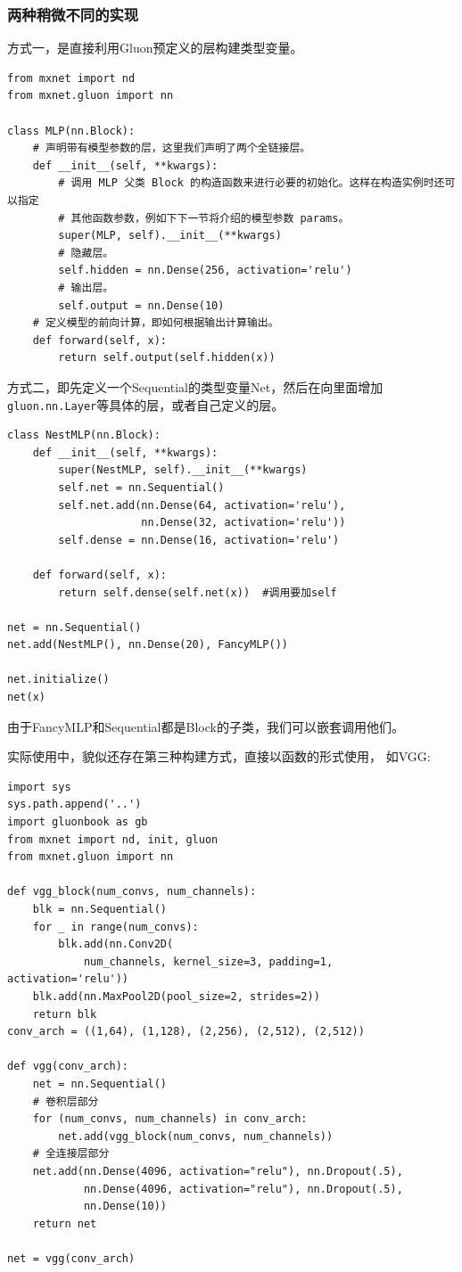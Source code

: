 \subsubsection{两种稍微不同的实现}
方式一，是直接利用Gluon预定义的层构建类型变量。
\begin{lstlisting}
from mxnet import nd
from mxnet.gluon import nn

class MLP(nn.Block):
    # 声明带有模型参数的层，这里我们声明了两个全链接层。
    def __init__(self, **kwargs):
        # 调用 MLP 父类 Block 的构造函数来进行必要的初始化。这样在构造实例时还可以指定
        # 其他函数参数，例如下下一节将介绍的模型参数 params。
        super(MLP, self).__init__(**kwargs)
        # 隐藏层。
        self.hidden = nn.Dense(256, activation='relu')
        # 输出层。
        self.output = nn.Dense(10)
    # 定义模型的前向计算，即如何根据输出计算输出。
    def forward(self, x):
        return self.output(self.hidden(x))
\end{lstlisting}

方式二，即先定义一个Sequential的类型变量Net，然后在向里面增加\verb|gluon.nn.Layer|等具体的层，或者自己定义的层。
\begin{lstlisting}
class NestMLP(nn.Block):
    def __init__(self, **kwargs):
        super(NestMLP, self).__init__(**kwargs)
        self.net = nn.Sequential()
        self.net.add(nn.Dense(64, activation='relu'),
                     nn.Dense(32, activation='relu'))
        self.dense = nn.Dense(16, activation='relu')

    def forward(self, x):
        return self.dense(self.net(x))  #调用要加self

net = nn.Sequential()
net.add(NestMLP(), nn.Dense(20), FancyMLP())

net.initialize()
net(x)
\end{lstlisting}

由于FancyMLP和Sequential都是Block的子类，我们可以嵌套调用他们。

实际使用中，貌似还存在第三种构建方式，直接以函数的形式使用， 如VGG:
\begin{lstlisting}
import sys
sys.path.append('..')
import gluonbook as gb
from mxnet import nd, init, gluon
from mxnet.gluon import nn

def vgg_block(num_convs, num_channels):
    blk = nn.Sequential()
    for _ in range(num_convs):
        blk.add(nn.Conv2D(
            num_channels, kernel_size=3, padding=1, activation='relu'))
    blk.add(nn.MaxPool2D(pool_size=2, strides=2))
    return blk
conv_arch = ((1,64), (1,128), (2,256), (2,512), (2,512))

def vgg(conv_arch):
    net = nn.Sequential()
    # 卷积层部分
    for (num_convs, num_channels) in conv_arch:
        net.add(vgg_block(num_convs, num_channels))
    # 全连接层部分
    net.add(nn.Dense(4096, activation="relu"), nn.Dropout(.5),
            nn.Dense(4096, activation="relu"), nn.Dropout(.5),
            nn.Dense(10))
    return net

net = vgg(conv_arch)
\end{lstlisting}

